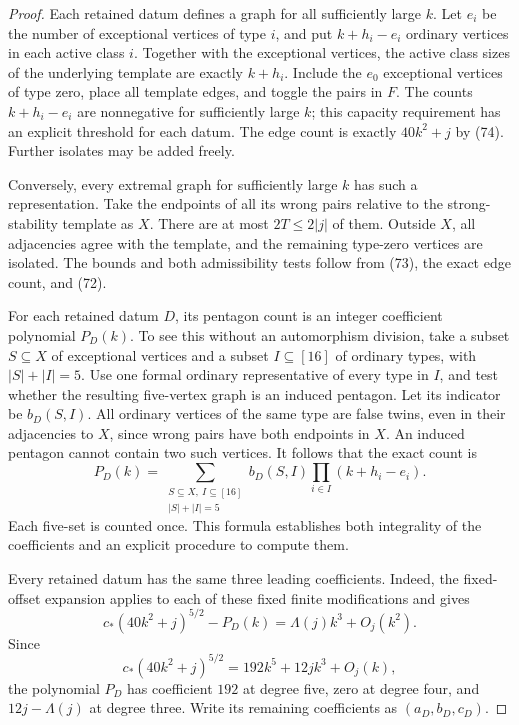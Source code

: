 \documentclass[11pt]{amsart}
\theoremstyle{definition}
\theoremstyle{remark}
\begin{document}
\begin{proof}
Each retained datum defines a graph for all sufficiently large $k$. Let
$e_i$ be the number of exceptional vertices of type $i$, and put
$k+h_i-e_i$ ordinary vertices in each active class $i$. Together with
the exceptional vertices, the active class sizes of the underlying
template are exactly $k+h_i$. Include the $e_0$ exceptional vertices of
type zero, place all template edges, and toggle the pairs in $F$. The
counts $k+h_i-e_i$ are nonnegative for sufficiently large $k$; this
capacity requirement has an explicit threshold for each datum. The
edge count is exactly $40k^2+j$ by (74). Further isolates may be added
freely.

Conversely, every extremal graph for sufficiently large $k$ has such a
representation. Take the endpoints of all its wrong pairs relative to
the strong-stability template as $X$. There are at most $2T\leq2|j|$ of
them. Outside $X$, all adjacencies agree with the template, and the
remaining type-zero vertices are isolated. The bounds and both
admissibility tests follow from (73), the exact edge count, and (72).

For each retained datum $D$, its pentagon count is an integer
coefficient polynomial $P_D(k)$. To see this without an automorphism
division, take a subset $S\subseteq X$ of exceptional vertices and a
subset $I\subseteq[16]$ of ordinary types, with $|S|+|I|=5$. Use one
formal ordinary representative of every type in $I$, and test whether
the resulting five-vertex graph is an induced pentagon. Let its
indicator be $b_D(S,I)$. All ordinary vertices of the same type are
false twins, even in their adjacencies to $X$, since wrong pairs have
both endpoints in $X$. An induced pentagon cannot contain two such
vertices. It follows that the exact count is
\begin{equation}\tag{75}\label{eq:exact-construction-polynomial}
 P_D(k)=\sum_{\substack{S\subseteq X,\ I\subseteq[16]\\|S|+|I|=5}}
              b_D(S,I)\prod_{i\in I}(k+h_i-e_i).
\end{equation}
Each five-set is counted once. This formula establishes both
integrality of the coefficients and an explicit procedure to compute
them.

Every retained datum has the same three leading coefficients. Indeed,
the fixed-offset expansion applies to each of these fixed finite
modifications and gives
\[
 c_\ast(40k^2+j)^{5/2}-P_D(k)=\Lambda(j)k^3+O_j(k^2).
\]
Since
\[
 c_\ast(40k^2+j)^{5/2}=192k^5+12jk^3+O_j(k),
\]
the polynomial $P_D$ has coefficient $192$ at degree five, zero at
degree four, and $12j-\Lambda(j)$ at degree three. Write its remaining
coefficients as $(a_D,b_D,c_D)$.


\end{proof}
\end{document}
